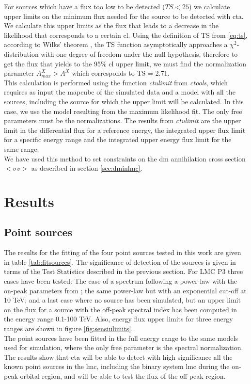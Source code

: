 \documentclass[main.tex]{subfiles}
\begin{document}
For sources which have a flux too low to be detected ($TS < 25$) we calculate upper limits on the minimum flux needed for the source to be detected with \gls{cta}. We calculate this upper limits as the flux that leads to a decrease in the likelihood that corresponds to a certain \gls{cl}. Using the definition of TS from \ref{eq:ts}, according to Wilks' theorem \cite{wilks1938}, the TS function asymptotically approaches a $\chi^2$-distribution with one degree of freedom under the null hypothesis, therefore to get the flux that yields to the 95\% \gls{cl} upper limit, we must find the normalization parameter $A^X_{max} > A^{X}$ which corresponds to TS = 2.71.\\
This calculation is performed using the function \textit{ctulimit} from \textit{ctools}, which requires as input the mapcube of the simulated data and a model with all the sources, including the source for which the upper limit will be calculated. In this case, we use the model resulting from the maximum likelihood fit. The only free parameters must be the normalizations. The results from \textit{ctulimit} are the upper limit in the differential flux for a reference energy, the integrated upper flux limit for a specific energy range and the integrated upper energy flux limit for the same range.\\
We have used this method to set constraints on the \gls{dm} annihilation cross section $<\sigma v>$ as described in section \ref{sec:dminlmc}.

\section{Results}\label{sec:results}
        
\subsection{Point sources}

The results for the fitting of the four point sources tested in this work are given in table \ref{tab:fitsources}. The significance of detection of the sources is given in terms of the Test Statistics described in the previous section. For LMC P3 three cases have been tested: The case of a spectrum following a power-law with the on-peak parameters from \cite{2017HESSLMCP3}; the same power-law but with an exponential cut-off at 10 TeV; and a last case where no source has been simulated, but an upper limit on the flux for a source with the off-peak spectral index has been computed in the energy range 0.1-100 TeV. Also, energy flux upper limits for three energy ranges are shown in figure \ref{fig:sensiulimits}.\\
The point sources have been fitted in the full energy range to the same models used for simulation, where the only free parameter is the spectral normalization.
The results show that \gls{cta} will be able to detect with high significance all the known point sources in the \gls{lmc}, including the binary system \gls{lmc} during the on-peak orbital region, and will be able to test the flux of the off-peak region. 
\end{document}
